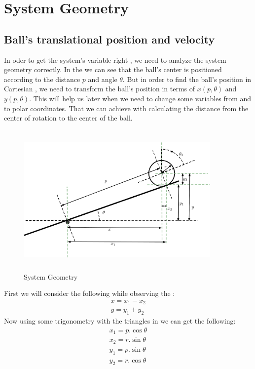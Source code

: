 \documentclass{article}
\begin{document}
\section{System Geometry}

\subsection{Ball's translational position and velocity}
In oder to get the system's variable right , we need to analyze the system geometry correctly.
In the  we can see that the ball's center is positioned according to the distance $p$ and angle $\theta$.
But in order to find the ball's position in Cartesian , we need to transform the ball's position in terms of $x(p,\theta)$ and $y(p,\theta)$.
This will help us later when we need to change some variables from and to polar coordinates.
That we can achieve with calculating the distance from the center of rotation to the center of the ball. 

\begin{figure}[h]
	\centering
	\includegraphics[height =7.5cm,width =10cm]{System_Geo}
	\caption{System Geometry}\label{SystemGeometry}
\end{figure}
\newpage
First we will consider the following while observing the :
\begin{equation}
	\begin{split}
		x = x_1 - x_2 \\
		y = y_1 + y_2 
	\end{split}
\end{equation}
Now using some trigonometry with the triangles in  we can get the following:
\begin{equation}
	\begin{split}
		x_1 = p.\cos{\theta} \\
		x_2 = r.\sin{\theta} \\
		y_1 = p.\sin{\theta} \\
		y_2 = r.\cos{\theta} 
	\end{split}
\end{equation}
\end{document}

